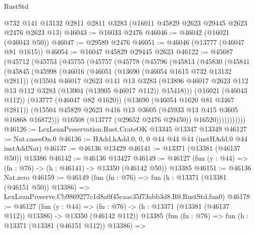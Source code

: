 \begin{lexlean}{RustStd}
\begin{coremodule}
    @732
    @141
    @13132
    @2811
    @2811
    @3283
    (@16011 @45829 @2623 @29445 @2623 @2476 @2623 @13)
@46043 := @16033 @2476
@46046 := @46042 (@16021 (@46043 @50))
@46047 := @29589 @2476
@46051 := @46046 (@13777 (@46047 @81 @1615))
@46054 := @16047 @45829 @29445 @2623
@46122 := @45687
    (@45712
      (@45753
        (@45755
          (@45757
            (@45778
              (@45796
                (@45813
                  (@45830
                    (@45841
                      (@45845
                        (@45998
                          (@46016
                            (@46051
                              (@13690 (@46054 @1615 @732 @13132 @2811))
                              (@15504
                                @46017
                                @2623
                                @141
                                @13
                                @3283
                                (@13896
                                  @46017
                                  @2623
                                  @112
                                  @13
                                  @112
                                  @3283
                                  (@13904 (@13905 @46017 @112))
                                  @15418)))
                            (@16021 (@46043 @112))
                            (@13777 (@46047 @82 @1620))
                            (@13690 (@46054 @1620 @81 @3467 @2811))
                            (@15504
                              @45829
                              @2623
                              @416
                              @13
                              @3605
                              (@45933 @13 @415 @3605 @16868 @16872)))
                          @16508
                          (@13777 (@29652 @2476 @29450))
                          @16520)))))))))))
@46126 := LexLeanPreservation.Rust.CrateOK @13345 @13347 @13349
@46127 := Nat.casesOn.{0}
@46136 := HAdd.hAdd.{0, 0, 0} @44 @44 @44 (instHAdd.{0} @44 instAddNat)
@46137 := @46136 @13429
@46141 := @13371 (@13381 (@46137 @50)) @13386
@46142 := @46136 @13427
@46149 := @46127 (fun (y : @44) => (fn : @76) -> (h : @46141) -> @13350 (@46142 @50)) @13385
@46151 := @46136 Nat.zero
@46159 := @46149
    (fun (fn : @76) =>
    fun (h : @13371 (@13381 (@46151 @50)) @13386) =>
    LexLeanPreserve.Cb9869277c1d8a0f45caac35f73abb3d8.R0.RustStd.fun0)
@46178 := @46127
    (fun (y : @44) =>
    (fn : @76) -> (h : @13371 (@13381 (@46137 @112)) @13386) -> @13350 (@46142 @112))
    @13385
    (fun (fn : @76) =>
    fun (h : @13371 (@13381 (@46151 @112)) @13386) =>

\end{coremodule}
\end{lexlean}
